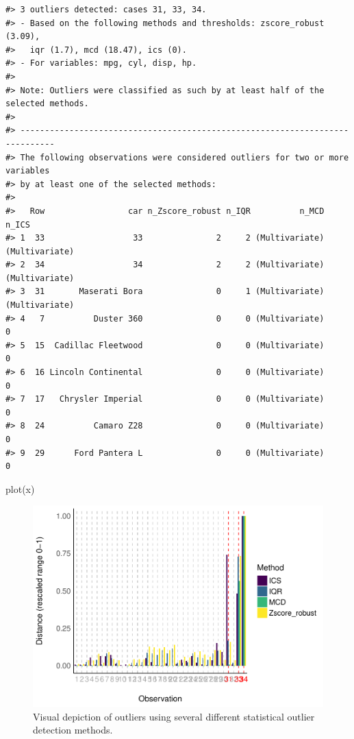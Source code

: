 \documentclass[
]{article}
\newenvironment{Shaded}{\begin{snugshade}}{\end{snugshade}}
\newcommand{\FunctionTok}[1]{\textcolor[rgb]{0.00,0.00,0.00}{#1}}
\newcommand{\NormalTok}[1]{#1}
\begin{document}
\begin{verbatim}
#> 3 outliers detected: cases 31, 33, 34.
#> - Based on the following methods and thresholds: zscore_robust (3.09),
#>   iqr (1.7), mcd (18.47), ics (0).
#> - For variables: mpg, cyl, disp, hp.
#> 
#> Note: Outliers were classified as such by at least half of the selected methods. 
#> 
#> -----------------------------------------------------------------------------
#> The following observations were considered outliers for two or more variables 
#> by at least one of the selected methods: 
#> 
#>   Row                 car n_Zscore_robust n_IQR          n_MCD          n_ICS
#> 1  33                  33               2     2 (Multivariate) (Multivariate)
#> 2  34                  34               2     2 (Multivariate) (Multivariate)
#> 3  31       Maserati Bora               0     1 (Multivariate) (Multivariate)
#> 4   7          Duster 360               0     0 (Multivariate)              0
#> 5  15  Cadillac Fleetwood               0     0 (Multivariate)              0
#> 6  16 Lincoln Continental               0     0 (Multivariate)              0
#> 7  17   Chrysler Imperial               0     0 (Multivariate)              0
#> 8  24          Camaro Z28               0     0 (Multivariate)              0
#> 9  29      Ford Pantera L               0     0 (Multivariate)              0
\end{verbatim}

\begin{Shaded}
\begin{Highlighting}[]
\FunctionTok{plot}\NormalTok{(x)}
\end{Highlighting}
\end{Shaded}

\begin{figure}
\includegraphics[width=1\linewidth]{paper_files/figure-latex/multimethod-1} \caption{Visual depiction of outliers using several different statistical outlier detection methods.}\label{fig:multimethod}
\end{figure}
\end{document}

